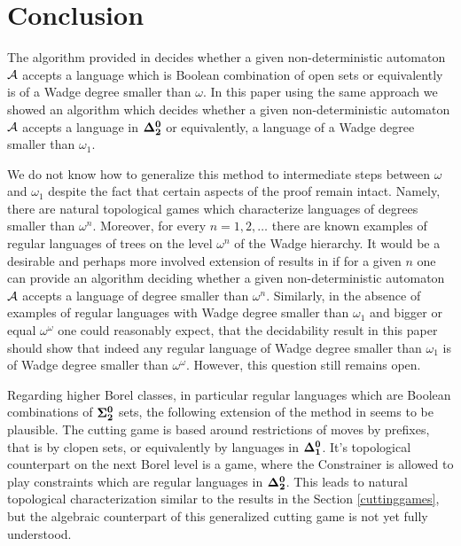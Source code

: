 \section{Conclusion}
The algorithm provided in \cite{bp} decides whether a given non-deterministic automaton ${\mathcal A}$ accepts a language which is Boolean combination of open sets or equivalently is of a  Wadge degree smaller than $\omega$. In this paper using the same approach we showed an algorithm which decides whether a given non-deterministic automaton ${\mathcal A}$ accepts a language in ${\bf \Delta^0_2}$ or equivalently, a language of a Wadge degree smaller than $\omega_1$. 

We do not know how to generalize this method to intermediate steps between $\omega$ and $\omega_1$ despite the fact that certain aspects of the proof remain intact. Namely, there are natural topological games which characterize languages of degrees smaller than $\omega^n$. Moreover, for every $n=1,2,\dots$ there are known examples of regular languages of trees on the level $\omega^n$ of the Wadge hierarchy. It would be a desirable and perhaps more involved extension of results in \cite{bp} if for a given $n$ one can provide an algorithm deciding whether a given non-deterministic automaton ${\mathcal A}$ accepts a language of degree smaller than $\omega^n$. Similarly, in the absence of examples of regular languages with Wadge degree smaller than $\omega_1$ and bigger or equal $\omega^\omega$ one could reasonably expect, that the decidability result in this paper should show that indeed any regular language of Wadge degree smaller than $\omega_1$ is of Wadge degree smaller than $\omega^\omega$. However, this question still remains open.  

Regarding higher Borel classes, in particular regular languages which are Boolean combinations of ${\bf \Sigma^0_2}$ sets, the following extension of the method in \cite{bp} seems to be plausible. The cutting game is based around restrictions of moves by prefixes, that is by clopen sets, or equivalently by languages in ${\bf \Delta^0_1}$. It's  topological counterpart on the next Borel level is a game, where the Constrainer is allowed to play constraints which are regular languages in ${\bf \Delta^0_2}$. This leads to natural topological characterization similar to the results in the Section \ref{cuttinggames}, but the algebraic counterpart of this generalized cutting game is not yet fully understood.
